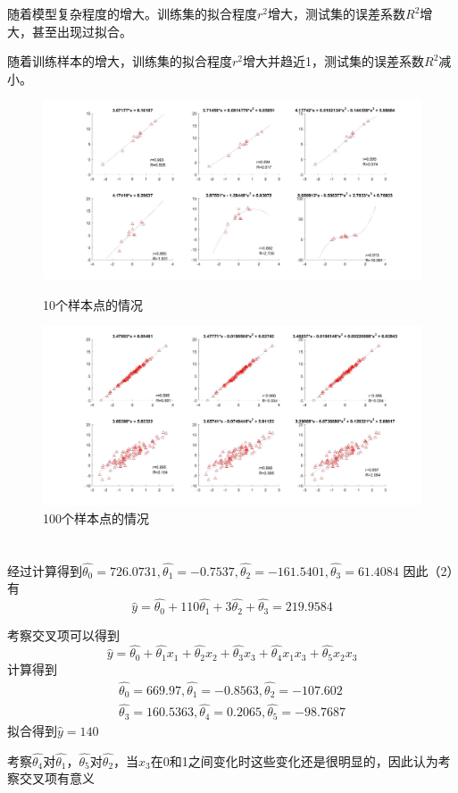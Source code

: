 \documentclass[UTF8,a4paper]{ctexart}
\begin{document}
随着模型复杂程度的增大。训练集的拟合程度$r^2$增大，测试集的误差系数$R^2$增大，甚至出现过拟合。

随着训练样本的增大，训练集的拟合程度$r^2$增大并趋近1，测试集的误差系数$R^2$减小。
\begin{figure}
\centering
\includegraphics[width=\textwidth]{prob2/10.jpg}
\caption{10个样本点的情况}
\label{10}
\includegraphics[width=\textwidth]{prob2/100.jpg}
\caption{100个样本点的情况}
\label{100}
\end{figure}
\section{}
经过计算得到$\hat{\theta_0}=726.0731,\hat{\theta_1}=-0.7537,\hat{\theta_2}=-161.5401,\hat{\theta_3}=61.4084$
因此（2）有$$\hat{y}=\hat{\theta_0}+110\hat{\theta_1}+3\hat{\theta_2}+\hat{\theta_3}=219.9584$$

考察交叉项可以得到$$\hat{y}=\hat{\theta_0}+\hat{\theta_1}x_1+\hat{\theta_2}x_2+\hat{\theta_3}x_3+\hat{\theta_4}x_1x_3+\hat{\theta_5}x_2x_3$$
计算得到  
$$\begin{aligned}\hat{\theta_0}=669.97,\hat{\theta_1}=-0.8563,\hat{\theta_2}=-107.602\\ \hat{\theta_3}=160.5363,\hat{\theta_4}=0.2065,\hat{\theta_5}=-98.7687\end{aligned}$$
拟合得到$\hat{y}=140$

考察$\hat{\theta_4}$对$\hat{\theta_1}$，$\hat{\theta_5}$对$\hat{\theta_2}$，当$x_3$在0和1之间变化时这些变化还是很明显的，因此认为考察交叉项有意义
\end{document}
